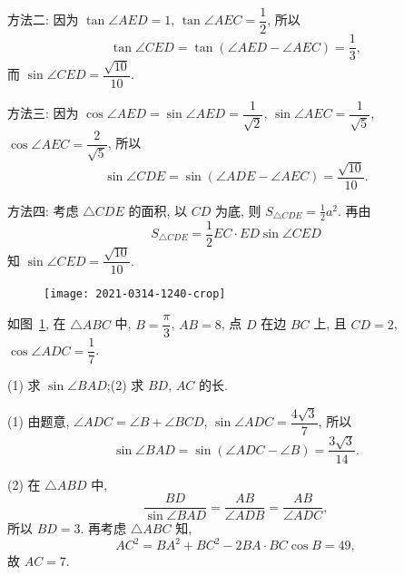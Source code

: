     方法二: 因为 $\tan\angle AED= 1$, $\tan\angle AEC= \dfrac12$, 所以
    \[\tan\angle CED= \tan(\angle AED- \angle AEC)= \frac13,\]
    而 $\sin\angle CED= \dfrac{\sqrt{10}}{10}$.

    方法三: 因为 $\cos\angle AED= \sin\angle AED= \dfrac1{\sqrt2}$, $\sin\angle AEC= \dfrac1{\sqrt5}$, $\cos\angle AEC= \dfrac2{\sqrt5}$, 所以
    \[\sin\angle CDE= \sin(\angle ADE- \angle AEC)
        = \dfrac{\sqrt{10}}{10}.\]
    
    方法四: 考虑 $\triangle CDE$ 的面积, 以 $CD$ 为底, 则 $S_{\triangle CDE}= \frac12 a^2$. 再由
    \[S_{\triangle CDE}= \frac12 EC\cdot ED \sin\angle CED\]
    知 $\sin\angle CED= \dfrac{\sqrt{10}}{10}$.
\endsolution

\begin{figure}[htb]
\small
\centering
\begin{minipage}[b]{0.45\linewidth}
    \centering
    \texttt{[image: 2021-0314-1240-crop]}
    \caption{}\label{fig:2021-0314-1240}
\end{minipage}
\hskip 0.5cm%
\begin{minipage}[b]{0.45\linewidth}
    \centering
    \caption{}\label{fig-180801-1830}
\end{minipage}
\end{figure}

\begin{exercise}
    如图~\ref{fig-180801-1830}, 在 $\triangle ABC$ 中, $B=\dfrac\pi3$, $AB=8$, 点 $D$ 在边 $BC$ 上,
    且 $CD=2$, $\cos\angle ADC= \dfrac17$.
    
    (1) 求 $\sin\angle BAD$;\qquad (2) 求 $BD$, $AC$ 的长.    
\end{exercise}
\beginsolution
    (1) 由题意, $\angle ADC= \angle B+ \angle BCD$, $\sin\angle ADC= \dfrac{4\sqrt3}7$, 所以
    \[\sin\angle BAD= \sin(\angle ADC- \angle B)
        = \dfrac{3\sqrt3}{14}.\]

    (2) 在 $\triangle ABD$ 中,
    \[\frac{BD}{\sin\angle BAD}= \frac{AB}{\angle ADB}
        = \frac{AB}{\angle ADC},\]
    所以 $BD=3$. 再考虑 $\triangle ABC$ 知,
    \[AC^2= BA^2+ BC^2- 2BA\cdot BC\cos B= 49,\]
    故 $AC=7$.
\endsolution